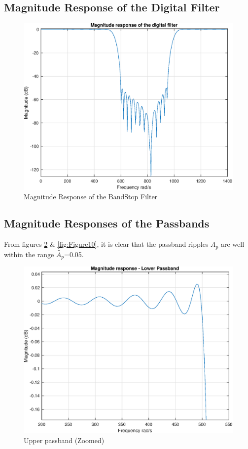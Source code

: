 \documentclass[11pt]{article}
\begin{document}
\subsection{Magnitude Response of the Digital Filter}
\begin{figure}[H]
    \centering
    \includegraphics[scale=0.7]{mag.eps} 
    \caption{Magnitude Response of the BandStop Filter}
    \label{fig:kaiser-freqz}
\end{figure}

\newpage
\subsection{Magnitude Responses of the Passbands}
From figures \ref{fig:Figure9} \& \ref{fig:Figure10}, it is clear that the passband ripples ${A_p}$ are well within the range ${\tilde{A_p}}$=0.05.
\begin{figure}[H]
    \centering
    \includegraphics[width=0.7\linewidth]{upassband.eps}
    \caption{Upper passband (Zoomed)}
    \label{fig:Figure9}
\end{figure}
\end{document}
